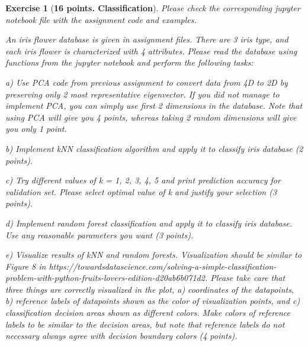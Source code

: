 \documentclass[a4paper,10pt]{article}
\newtheorem{exer}{Exercise}
\newenvironment{packed_itemize}{
\begin{itemize}
  \setlength{\itemsep}{1pt}
  \setlength{\parskip}{0pt}
  \setlength{\parsep}{0pt}
}{\end{itemize}}
\begin{document}
\begin{exer}[\bf 16 points. Classification]
Please check the corresponding jupyter notebook file with the assignment code and examples.

An iris flower database is given in assignment files. There are 3 iris type, and each iris flower is characterized with 4 attributes. Please read the database using functions from the jupyter notebook and perform the following tasks:
\par
\begin{packed_itemize}
\item[a)] Use PCA code from previous assignment to convert data from 4D to 2D by preserving only 2 most representative eigenvector. If you did not manage to implement PCA, you can simply use first 2 dimensions in the database. Note that using PCA will give you 4 points, whereas taking 2 random dimensions will give you only 1 point.
\item[b)] Implement kNN classification algorithm and apply it to classify iris database (2 points).
\item[c)] Try different values of k = {1, 2, 3, 4, 5} and print prediction accuracy for validation set. Please select optimal value of k and justify your selection (3 points).
\item[d)] Implement random forest classification and apply it to classify iris database. Use any reasonable parameters you want (3 points).
\item[e)] Visualize results of kNN and random forests. Visualization should be similar to Figure 8 in  https://towardsdatascience.com/solving-a-simple-classification-problem-with-python-fruits-lovers-edition-d20ab6b071d2. Please take care that three things are correctly visualized in the plot, a) coordinates of the datapoints, b) reference labels of datapoints shown as the color of visualization points, and c) classification decision areas shown as different colors. Make colors of reference labels to be similar to the decision areas, but note that reference labels do not necessary always agree with decision boundary colors (4 points).
\end{packed_itemize}


\end{exer}
\vskip20pt
\end{document}
